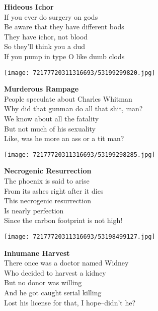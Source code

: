 \documentclass[10pt,letterpaper]{article}
\begin{document}
\begin{center}
\textbf{Hideous Ichor}\\
\vskip 0.2in
If you ever do surgery on gods\\
Be aware that they have different bods\\
They have ichor, not blood\\
So they'll think you a dud\\
If you pump in type O like dumb clods\\
\end{center}
\pagebreak

\begin{center}
\texttt{[image: 72177720311316693/53199299820.jpg]}
\end{center}

\begin{center}
\textbf{Murderous Rampage}\\
\vskip 0.2in
People speculate about Charles Whitman\\
Why did that gunman do all that shit, man?\\
We know about all the fatality\\
But not much of his sexuality\\
Like, was he more an ass or a tit man?\\
\end{center}
\pagebreak

\begin{center}
\texttt{[image: 72177720311316693/53199298285.jpg]}
\end{center}

\begin{center}
\textbf{Necrogenic Resurrection}\\
\vskip 0.2in
The phoenix is said to arise\\
From its ashes right after it dies\\
This necrogenic resurrection\\
Is nearly perfection\\
Since the carbon footprint is not high!\\
\end{center}
\pagebreak

\begin{center}\texttt{[image: 72177720311316693/53198499127.jpg]}
\end{center}
\begin{center}
\textbf{Inhumane Harvest}\\
\vskip 0.2in
There once was a doctor named Widney\\
Who decided to harvest a kidney\\
But no donor was willing\\
And he got caught serial killing\\
Lost his license for that, I hope--didn't he?\\
\end{center}
\end{document}
